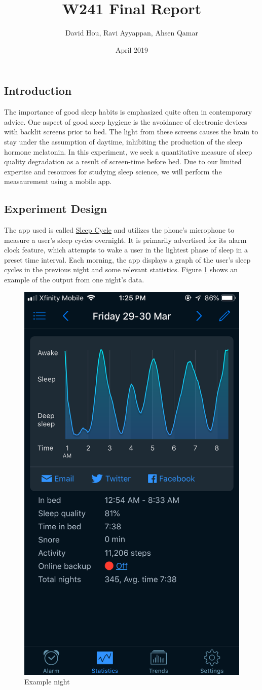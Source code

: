 \documentclass[]{article}
\title{W241 Final Report}
\author{David Hou, Ravi Ayyappan, Ahsen Qamar}
\date{April 2019}
\begin{document}
\maketitle

\hypertarget{introduction}{%
\subsection{Introduction}\label{introduction}}

The importance of good sleep habits is emphasized quite often in
contemporary advice. One aspect of good sleep hygiene is the avoidance
of electronic devices with backlit screens prior to bed. The light from
these screens causes the brain to stay under the assumption of daytime,
inhibiting the production of the sleep hormone melatonin. In this
experiment, we seek a quantitative measure of sleep quality degradation
as a result of screen-time before bed. Due to our limited expertise and
resources for studying sleep science, we will perform the measaurement
using a mobile app.

\hypertarget{experiment-design}{%
\subsection{Experiment Design}\label{experiment-design}}

The app used is called \href{www.sleepcycle.com}{Sleep Cycle} and
utilizes the phone's microphone to measure a user's sleep cycles
overnight. It is primarily advertised for its alarm clock feature, which
attempts to wake a user in the lightest phase of sleep in a preset time
interval. Each morning, the app displays a graph of the user's sleep
cycles in the previous night and some relevant statistics. Figure
\ref{fig:example_night} shows an example of the output from one night's
data.

\begin{figure}[H]

{\centering \includegraphics[width=0.25\linewidth]{img/example_night} 

}

\caption{Example night}\label{fig:example_night}
\end{figure}
\end{document}
